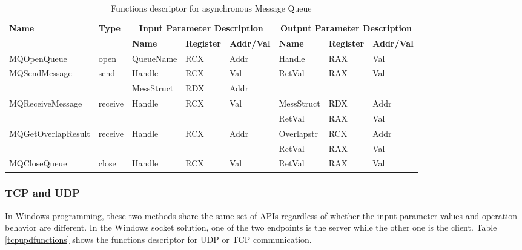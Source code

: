 \begin{table}[H]
  \centering
  \caption{Functions descriptor for asynchronous Message Queue}
  \label{msmqasynfunctions}
\begin{tabular}{|l|l|l|l|l|l|l|l|}
\hline
             \multirow{2}{*}{{\textbf{Name}}} & \multirow{2}{*}{{\textbf{Type}}} & \multicolumn{3}{c|}{\textbf{Input Parameter Description}} & \multicolumn{3}{c|}{\textbf{Output Parameter Description}} \\
              \cline{3-8} 
             & & \textbf{Name}& \textbf{Register} & \textbf{Addr/Val} & \textbf{Name}& \textbf{Register} &  \textbf{Addr/Val}  \\
             \hline
      MQOpenQueue
       &open & QueueName & RCX  & Addr &  Handle & RAX & Val\\
      \hline                     
      \multirow{2}{*}{MQSendMessage}
       &\multirow{2}{*}{send} &  Handle & RCX & Val & \multirow{2}{*}{RetVal} & \multirow{2}{*}{RAX}  & \multirow{2}{*}{Val} \\
       \cline{3-5}
      & & MessStruct& RDX&Addr &   &  &  \\
      \hline            
           \multirow{2}{*}{MQReceiveMessage}
       &\multirow{2}{*}{receive}&  \multirow{2}{*}{Handle} & \multirow{2}{*}{RCX} & \multirow{2}{*}{Val}& MessStruct& RDX&Addr\\
              \cline{6-8}
      & & & & & RetVal & RAX & Val\\
      \hline    
      \multirow{2}{*}{MQGetOverlapResult} &
       \multirow{2}{*}{receive} &  \multirow{2}{*}{Handle} & \multirow{2}{*}{RCX} & \multirow{2}{*}{Addr} & Overlapstr& RCX&Addr\\
                     \cline{6-8}
      & & & & & RetVal & RAX & Val\\
      \hline      
      MQCloseQueue &
       close &  Handle & RCX & Val & RetVal & RAX & Val\\
      \hline                          
  \end{tabular}   
\end{table}


    
\subsubsection{TCP and UDP}
In Windows programming, these two methods share the same set of APIs regardless of whether the input parameter values and operation behavior are different. In the Windows socket solution, one of the two endpoints is the server while the other one is the client. Table \ref{tcpupdfunctions} shows the functions descriptor for UDP or TCP communication. 

